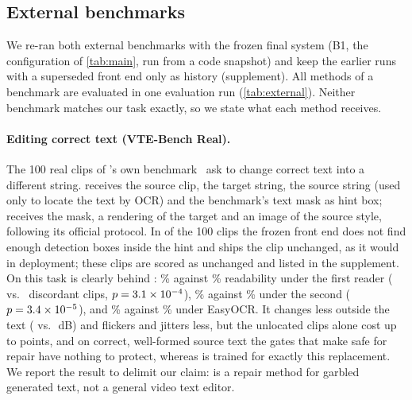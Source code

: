 \subsection{External benchmarks}
\label{sec:exp_external}

We re-ran both external benchmarks with the frozen final system (B1, the configuration of \cref{tab:main}, run from a code snapshot) and keep the earlier runs with a superseded front end only as history (supplement). All methods of a benchmark are evaluated in one evaluation run (\cref{tab:external}). Neither benchmark matches our task exactly, so we state what each method receives.

\paragraph{Editing correct text (VTE-Bench Real).} The 100 real clips of \steer's own benchmark~\cite{zeng2026steervte} ask to change correct text into a different string. \method receives the source clip, the target string, the source string (used only to locate the text by OCR) and the benchmark's text mask as hint box; \steer receives the mask, a rendering of the target and an image of the source style, following its official protocol. In \xVteFails{} of the 100 clips the frozen front end does not find enough detection boxes inside the hint and ships the clip unchanged, as it would in deployment; these clips are scored as unchanged and listed in the supplement. On this task \method is clearly behind \steer: \xVteOurs\% against \xVteSteer\% readability under the first reader (\xVteOnlyOurs{} vs.\ \xVteOnlySteer{} discordant clips, $p=3.1\times10^{-4}$), \xVteOursIvl\% against \xVteSteerIvl\% under the second ($p=3.4\times10^{-5}$), and \xVteOursOcr\% against \xVteSteerOcr\% under EasyOCR. It changes less outside the text (\xVteOursBG{} vs.\ \xVteSteerBG\,dB) and flickers and jitters less, but the unlocated clips alone cost up to \xVteFails{} points, and on correct, well-formed source text the gates that make \method safe for repair have nothing to protect, whereas \steer is trained for exactly this replacement. We report the result to delimit our claim: \method is a repair method for garbled generated text, not a general video text editor.

